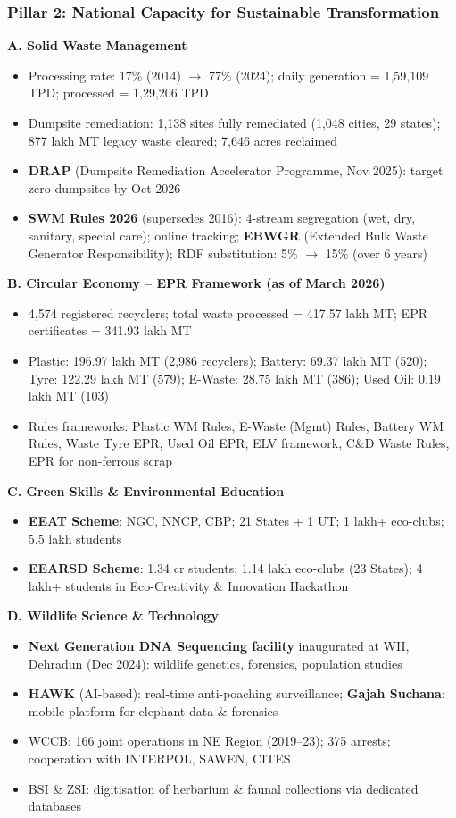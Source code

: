 \subsubsection*{Pillar 2: National Capacity for Sustainable Transformation}

\textbf{A. Solid Waste Management}
\begin{itemize}
  \item Processing rate: 17\% (2014) $\to$ 77\% (2024); daily generation = 1,59,109 TPD; processed = 1,29,206 TPD
  \item Dumpsite remediation: 1,138 sites fully remediated (1,048 cities, 29 states); 877 lakh MT legacy waste cleared; 7,646 acres reclaimed
  \item \textbf{DRAP} (Dumpsite Remediation Accelerator Programme, Nov 2025): target zero dumpsites by Oct 2026
  \item \textbf{SWM Rules 2026} (supersedes 2016): 4-stream segregation (wet, dry, sanitary, special care); online tracking; \textbf{EBWGR} (Extended Bulk Waste Generator Responsibility); RDF substitution: 5\% $\to$ 15\% (over 6 years)
\end{itemize}

\textbf{B. Circular Economy -- EPR Framework (as of March 2026)}
\begin{itemize}
  \item 4,574 registered recyclers; total waste processed = 417.57 lakh MT; EPR certificates = 341.93 lakh MT
  \item Plastic: 196.97 lakh MT (2,986 recyclers); Battery: 69.37 lakh MT (520); Tyre: 122.29 lakh MT (579); E-Waste: 28.75 lakh MT (386); Used Oil: 0.19 lakh MT (103)
  \item Rules frameworks: Plastic WM Rules, E-Waste (Mgmt) Rules, Battery WM Rules, Waste Tyre EPR, Used Oil EPR, ELV framework, C\&D Waste Rules, EPR for non-ferrous scrap
\end{itemize}

\textbf{C. Green Skills \& Environmental Education}
\begin{itemize}
  \item \textbf{EEAT Scheme}: NGC, NNCP, CBP; 21 States + 1 UT; 1 lakh+ eco-clubs; 5.5 lakh students
  \item \textbf{EEARSD Scheme}: 1.34 cr students; 1.14 lakh eco-clubs (23 States); 4 lakh+ students in Eco-Creativity \& Innovation Hackathon
\end{itemize}

\textbf{D. Wildlife Science \& Technology}
\begin{itemize}
  \item \textbf{Next Generation DNA Sequencing facility} inaugurated at WII, Dehradun (Dec 2024): wildlife genetics, forensics, population studies
  \item \textbf{HAWK} (AI-based): real-time anti-poaching surveillance; \textbf{Gajah Suchana}: mobile platform for elephant data \& forensics
  \item WCCB: 166 joint operations in NE Region (2019--23); 375 arrests; cooperation with INTERPOL, SAWEN, CITES
  \item BSI \& ZSI: digitisation of herbarium \& faunal collections via dedicated databases
\end{itemize}

